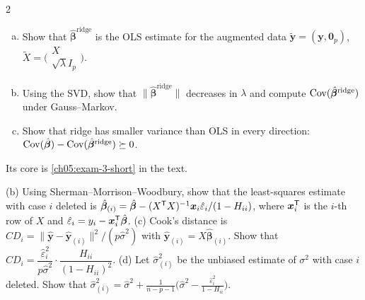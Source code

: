 \begin{paracol}{2}
\begin{exercise}\label{ch05:exam-3}
\leavevmode
\begin{enumerate}[(a)]
  \item Show that $\hat{\bm\beta}^{\text{ridge}}$ is the OLS estimate for the augmented data $\tilde{\bm y}=(\bm y,\bm 0_p)$,
      $\tilde X=\bigl(\begin{smallmatrix}X\\ \sqrt\lambda I_p\end{smallmatrix}\bigr)$.
  \item Using the SVD, show that $\|\hat{\bm\beta}^{\text{ridge}}\|$ decreases in $\lambda$ and compute
      $\operatorname{Cov}(\hat{\bm\beta}^{\text{ridge}})$ under Gauss--Markov.
  \item Show that ridge has smaller variance than OLS in every direction:
      $\operatorname{Cov}(\hat{\bm\beta})-\operatorname{Cov}(\hat{\bm\beta}^{\text{ridge}})\succeq0$.
\end{enumerate}
Its core is \cref{ch05:exam-3-short} in the text.
\end{exercise}

\begin{exercise}\label{ch05:ex-ps3-2bd}
(b) Using Sherman--Morrison--Woodbury, show that the least-squares estimate with case $i$ deleted is
$\hat{\bm\beta}_{(i)}=\hat{\bm\beta}-(X^{\mathsf T} X)^{-1}\bm x_i\hat\varepsilon_i/(1-H_{ii})$, where $\bm x_i^{\mathsf T}$ is the $i$-th row of $X$ and $\hat\varepsilon_i=y_i-\bm x_i^{\mathsf T}\hat{\bm\beta}$.
(c) Cook's distance is $CD_i=\|\hat{\bm y}-\hat{\bm y}_{(i)}\|^2/(p\hat\sigma^2)$ with $\hat{\bm y}_{(i)}=X\hat{\bm\beta}_{(i)}$. Show that
$CD_i=\dfrac{\hat\varepsilon_i^2}{p\hat\sigma^2}\cdot\dfrac{H_{ii}}{(1-H_{ii})^2}$.
(d) Let $\hat\sigma^2_{(i)}$ be the unbiased estimate of $\sigma^2$ with case $i$ deleted. Show that
$\hat\sigma^2_{(i)}=\hat\sigma^2+\frac{1}{n-p-1}\bigl(\hat\sigma^2-\frac{\hat\varepsilon_i^2}{1-H_{ii}}\bigr)$.
\end{exercise}


\end{paracol}
